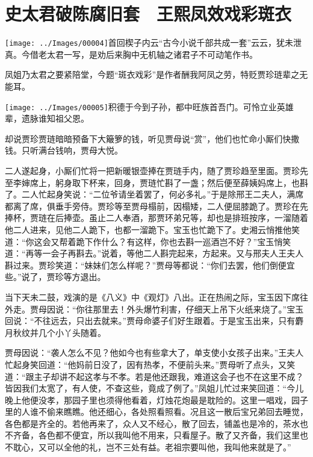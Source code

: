 

\chapter{史太君破陈腐旧套　王熙凤效戏彩斑衣}\label{part0058_split_000.htmlux5cux23calibre_pb_0}

{\texttt{[image: ../Images/00004]}首回楔子内云``古今小说千部共成一套''云云，犹未泄真。今借老太君一写，是劝后来胸中无机轴之诸君子不可动笔作书。}

{凤姐乃太君之要紧陪堂，今题``斑衣戏彩''是作者酬我阿凤之劳，特贬贾珍琏辈之无能耳。}

{\texttt{[image: ../Images/00005]}积德于今到子孙，都中旺族首吾门。可怜立业英雄辈，遗脉谁知祖父恩。}

却说贾珍贾琏暗暗预备下大簸箩的钱，听见贾母说``赏''，他们也忙命小厮们快撒钱。只听满台钱响，贾母大悦。

二人遂起身，小厮们忙将一把新暖银壶捧在贾琏手内，随了贾珍趋至里面。贾珍先至李婶席上，躬身取下杯来，回身，贾琏忙斟了一盏；然后便至薛姨妈席上，也斟了。二人忙起身笑说：``二位爷请坐着罢了，何必多礼。''于是除邢王二夫人，满席都离了席，俱垂手旁侍。贾珍等至贾母榻前，因榻矮，二人便屈膝跪了。贾珍在先捧杯，贾琏在后捧壶。虽止二人奉酒，那贾环弟兄等，却也是排班按序，一溜随着他二人进来，见他二人跪下，也都一溜跪下。宝玉也忙跪下了。史湘云悄推他笑道：``你这会又帮着跪下作什么？有这样，你也去斟一巡酒岂不好？''宝玉悄笑道：``再等一会子再斟去。''说着，等他二人斟完起来，方起来。又与邢夫人王夫人斟过来。贾珍笑道：``妹妹们怎么样呢？''贾母等都说：``你们去罢，他们倒便宜些。''说了，贾珍等方退出。

当下天未二鼓，戏演的是《八义》中《观灯》八出。正在热闹之际，宝玉因下席往外走。贾母因说：``你往那里去！外头爆竹利害，仔细天上吊下火纸来烧了。''宝玉回说：``不往远去，只出去就来。''贾母命婆子们好生跟着。于是宝玉出来，只有麝月秋纹并几个小丫头随着。

贾母因说：``袭人怎么不见？他如今也有些拿大了，单支使小女孩子出来。''王夫人忙起身笑回道：``他妈前日没了，因有热孝，不便前头来。''贾母听了点头，又笑道：``跟主子却讲不起这孝与不孝。若是他还跟我，难道这会子也不在这里不成？皆因我们太宽了，有人使，不查这些，竟成了例了。''凤姐儿忙过来笑回道：``今儿晚上他便没孝，那园子里也须得他看着，灯烛花炮最是耽险的。这里一唱戏，园子里的人谁不偷来瞧瞧。他还细心，各处照看照看。况且这一散后宝兄弟回去睡觉，各色都是齐全的。若他再来了，众人又不经心，散了回去，铺盖也是冷的，茶水也不齐备，各色都不便宜，所以我叫他不用来，只看屋子。散了又齐备，我们这里也不耽心，又可以全他的礼，岂不三处有益。老祖宗要叫他，我叫他来就是了。''

